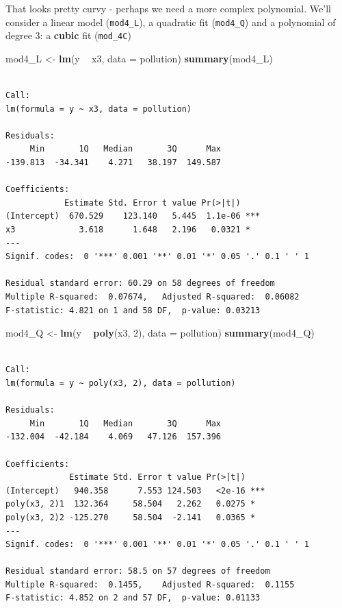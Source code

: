 \documentclass[]{book}
\newenvironment{Shaded}{\begin{snugshade}}{\end{snugshade}}
\newcommand{\KeywordTok}[1]{\textcolor[rgb]{0.13,0.29,0.53}{\textbf{#1}}}
\newcommand{\DataTypeTok}[1]{\textcolor[rgb]{0.13,0.29,0.53}{#1}}
\newcommand{\DecValTok}[1]{\textcolor[rgb]{0.00,0.00,0.81}{#1}}
\newcommand{\StringTok}[1]{\textcolor[rgb]{0.31,0.60,0.02}{#1}}
\newcommand{\OperatorTok}[1]{\textcolor[rgb]{0.81,0.36,0.00}{\textbf{#1}}}
\newcommand{\NormalTok}[1]{#1}
\theoremstyle{definition}
\theoremstyle{definition}
\theoremstyle{definition}
\theoremstyle{remark}
\begin{document}
That looks pretty curvy - perhaps we need a more complex polynomial.
We'll consider a linear model (\texttt{mod4\_L}), a quadratic fit
(\texttt{mod4\_Q}) and a polynomial of degree 3: a \textbf{cubic} fit
(\texttt{mod\_4C})

\begin{Shaded}
\begin{Highlighting}[]
\NormalTok{mod4_L <-}\StringTok{ }\KeywordTok{lm}\NormalTok{(y }\OperatorTok{~}\StringTok{ }\NormalTok{x3, }\DataTypeTok{data =}\NormalTok{ pollution)}
\KeywordTok{summary}\NormalTok{(mod4_L)}
\end{Highlighting}
\end{Shaded}

\begin{verbatim}

Call:
lm(formula = y ~ x3, data = pollution)

Residuals:
     Min       1Q   Median       3Q      Max 
-139.813  -34.341    4.271   38.197  149.587 

Coefficients:
            Estimate Std. Error t value Pr(>|t|)    
(Intercept)  670.529    123.140   5.445  1.1e-06 ***
x3             3.618      1.648   2.196   0.0321 *  
---
Signif. codes:  0 '***' 0.001 '**' 0.01 '*' 0.05 '.' 0.1 ' ' 1

Residual standard error: 60.29 on 58 degrees of freedom
Multiple R-squared:  0.07674,   Adjusted R-squared:  0.06082 
F-statistic: 4.821 on 1 and 58 DF,  p-value: 0.03213
\end{verbatim}

\begin{Shaded}
\begin{Highlighting}[]
\NormalTok{mod4_Q <-}\StringTok{ }\KeywordTok{lm}\NormalTok{(y }\OperatorTok{~}\StringTok{ }\KeywordTok{poly}\NormalTok{(x3, }\DecValTok{2}\NormalTok{), }\DataTypeTok{data =}\NormalTok{ pollution)}
\KeywordTok{summary}\NormalTok{(mod4_Q)}
\end{Highlighting}
\end{Shaded}

\begin{verbatim}

Call:
lm(formula = y ~ poly(x3, 2), data = pollution)

Residuals:
     Min       1Q   Median       3Q      Max 
-132.004  -42.184    4.069   47.126  157.396 

Coefficients:
             Estimate Std. Error t value Pr(>|t|)    
(Intercept)   940.358      7.553 124.503   <2e-16 ***
poly(x3, 2)1  132.364     58.504   2.262   0.0275 *  
poly(x3, 2)2 -125.270     58.504  -2.141   0.0365 *  
---
Signif. codes:  0 '***' 0.001 '**' 0.01 '*' 0.05 '.' 0.1 ' ' 1

Residual standard error: 58.5 on 57 degrees of freedom
Multiple R-squared:  0.1455,    Adjusted R-squared:  0.1155 
F-statistic: 4.852 on 2 and 57 DF,  p-value: 0.01133
\end{verbatim}
\end{document}
